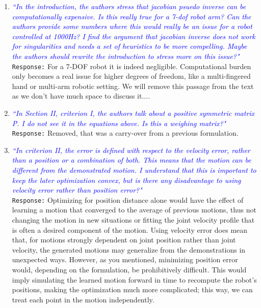 \documentclass{article}
\begin{document}
\begin{enumerate}
\item \textcolor{blue}{\textit{``In the introduction, the authors stress that jacobian psuedo inverse
can be computationally expensive. Is this really true for a 7-dof robot
arm? Can the authors provide some numbers where this would really be an
issue for a robot controlled at 1000Hz? I find the argument that
jacobian inverse does not work for singularities and needs a set of
heuristics to be more compelling. Maybe the authors should rewrite the
introduction to stress more on this issue?"}}\\
\texttt{Response:} \small For a 7-DOF robot it is indeed negligible. Computational burden only becomes a real issue for higher degrees of freedom, like a multi-fingered hand or multi-arm robotic setting. We will remove this passage from the text as we don't have much space to discuss it....\\

\item \textcolor{blue}{\textit{``In Section II, criterion I, the authors talk about a positive symmetric matrix P. I do not see it in the
equations above. Is this a weighing matrix?"}}\\
\texttt{Response:} \small Removed, that was a carry-over from a previous formulation.\\

\item \textcolor{blue}{\textit{``In criterion II, the error is defined with respect to the velocity error, rather than a position or a combination
of both. This means that the motion can be different from the demonstrated motion. I understand
that this is important to keep the later optimization convex, but is there any disadvantage to using
velocity error rather than position error?"}}\\
\texttt{Response:} \small Optimizing for position distance alone would have the effect of learning a motion that converged to the average of previous motions, thus not changing the motion in new situations or fitting the joint velocity profile that is often a desired component of the motion. Using velocity error does mean that, for motions strongly dependent on joint position rather than joint velocity, the generated motions may generalize from the demonstrations in unexpected ways. However, as you mentioned, minimizing position error would, depending on the formulation, be prohibitively difficult. This would imply simulating the learned motion forward in time to recompute the robot's positions, making the optimization much more complicated; this way, we can treat each point in the motion independently.\\


\end{enumerate}
\end{document}
